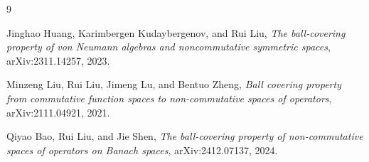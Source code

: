 \documentclass[11pt]{article}
\begin{document}
\begin{thebibliography}{9}

Jinghao Huang, Karimbergen Kudaybergenov, and Rui Liu,
\emph{The ball-covering property of von Neumann algebras and noncommutative
symmetric spaces},
arXiv:2311.14257, 2023.

Minzeng Liu, Rui Liu, Jimeng Lu, and Bentuo Zheng,
\emph{Ball covering property from commutative function spaces to
non-commutative spaces of operators},
arXiv:2111.04921, 2021.

Qiyao Bao, Rui Liu, and Jie Shen,
\emph{The ball-covering property of non-commutative spaces of operators on
Banach spaces},
arXiv:2412.07137, 2024.

\end{thebibliography}
\end{document}
